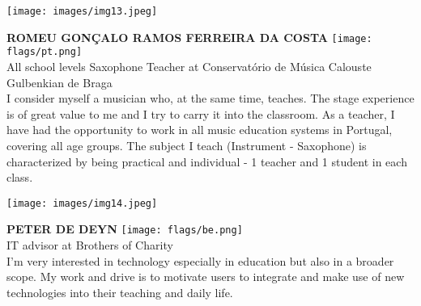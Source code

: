\noindent
\begin{minipage}{0.3\textwidth}
\centering
\texttt{[image: images/img13.jpeg]}
\end{minipage}
\hfill
\begin{minipage}{0.6\textwidth}\raggedright
\color{color1}\uppercase{\textbf{Romeu Gonçalo Ramos Ferreira da Costa}}
\color{color2}\hspace{0.2cm}\texttt{[image: flags/pt.png]}
\\
All school levels Saxophone Teacher at Conservatório de Música Calouste Gulbenkian de Braga\\
{\footnotesize I consider myself a musician who, at the same time, teaches. The stage experience is of great value to me and I try to carry it into the classroom. As a teacher, I have had the opportunity to work in all music education systems in Portugal, covering all age groups. The subject I teach (Instrument - Saxophone) is characterized by being practical and individual - 1 teacher and 1 student in each class.}\\
\end{minipage}
\newline\newline\newline

\noindent
\begin{minipage}{0.3\textwidth}
\centering
\texttt{[image: images/img14.jpeg]}
\end{minipage}
\hfill
\begin{minipage}{0.6\textwidth}\raggedright
\color{color1}\uppercase{\textbf{Peter De Deyn}}
\color{color2}\hspace{0.2cm}\texttt{[image: flags/be.png]}
\\
IT advisor at Brothers of Charity\\
{\footnotesize I'm very interested in  technology especially in education but also in a broader scope. My work and drive is to motivate users to integrate and make use of new technologies into their teaching and daily life.}\\
\end{minipage}
\newline\newline\newline

